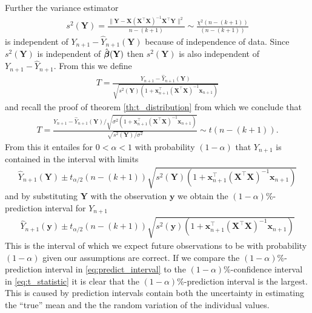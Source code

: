 Further the variance estimator
\begin{align*}
    s^2(\textbf{Y})=\frac{\|\textbf{Y} - \textbf{X}( \textbf{X}^\top\textbf{X} )^{-1}\textbf{X}^\top\textbf{Y}\|^2}{n-(k+1)} \sim \frac{\chi^2(n-(k+1))}{(n-(k+1))}
\end{align*}
is independent of $Y_{n+1}-\hat{Y}_{n+1}(\textbf{Y})$ because of independence of data.
Since $s^2(\textbf{Y})$ is independent of $\hat{\operatorname{\boldsymbol{\beta}}}(\textbf{Y})$ then $s^2(\textbf{Y})$ is also independent of $Y_{n+1}-\hat{Y}_{n+1}$.
From this we define
\begin{align*}
    T=\frac{Y_{n+1}-\hat{Y}_{n+1}(\textbf{Y})}{\sqrt{s^2(\textbf{Y})(1+\textbf{x}^\top_{n+1}(\textbf{X}^\top\textbf{X})^{-1}\textbf{x}_{n+1})}}
\end{align*}
and recall the proof of theorem \ref{th:t_distribution} from which we conclude that
\begin{align*}
    T=\frac{Y_{n+1}-\hat{Y}_{n+1}(\textbf{Y})/\sqrt{\sigma^2(1+\textbf{x}^\top_{n+1}(\textbf{X}^\top\textbf{X})^{-1}\textbf{x}_{n+1})}}{\sqrt{s^2(\textbf{Y})/\sigma^2}} \sim t(n-(k+1)).
\end{align*}
From this it entailes for $0<\alpha<1$ with probability $(1-\alpha)$ that $Y_{n+1}$ is contained in the interval with limits
\begin{align*}
    \hat{Y}_{n+1}(\textbf{Y})\pm t_{\alpha/2}(n-(k+1))\sqrt{s^2(\textbf{Y})(1+\textbf{x}^\top_{n+1}(\textbf{X}^\top\textbf{X})^{-1}\textbf{x}_{n+1})}
\end{align*}
and by substituting $\textbf{Y}$ with the observation $\textbf{y}$ we obtain the $(1-\alpha)\%$-prediction interval for $Y_{n+1}$
\begin{align} \label{eq:predict_interval}
    \hat{Y}_{n+1}(\textbf{y})\pm t_{\alpha/2}(n-(k+1))\sqrt{s^2(\textbf{y})(1+\textbf{x}^\top_{n+1}(\textbf{X}^\top\textbf{X})^{-1}\textbf{x}_{n+1})}
\end{align}
This is the interval of which we expect future observations to be with probability $(1-\alpha)$ given our assumptions are correct.
If we compare the $(1-\alpha)\%$-prediction interval in \eqref{eq:predict_interval} to the $(1-\alpha)\%$-confidence interval in \eqref{eq:t_statistic} it is clear that the $(1-\alpha)\%$-prediction interval is the largest.
This is caused by prediction intervals contain both the uncertainty in estimating the ``true'' mean and the the random variation of the individual values.

